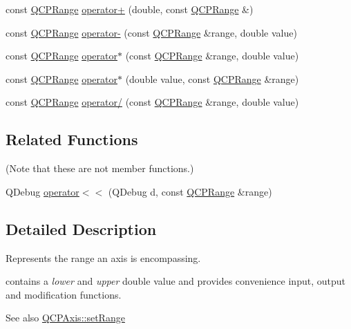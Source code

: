 \begin{DoxyCompactItemize}
\item 
const \hyperlink{class_q_c_p_range}{Q\+C\+P\+Range} \hyperlink{class_q_c_p_range_a9fb2e9941d32001482df670c0d704977}{operator+} (double, const \hyperlink{class_q_c_p_range}{Q\+C\+P\+Range} \&)
\item 
const \hyperlink{class_q_c_p_range}{Q\+C\+P\+Range} \hyperlink{class_q_c_p_range_a797f82830b516646da8873f82e39e356}{operator-\/} (const \hyperlink{class_q_c_p_range}{Q\+C\+P\+Range} \&range, double value)
\item 
const \hyperlink{class_q_c_p_range}{Q\+C\+P\+Range} \hyperlink{class_q_c_p_range_a558b1248ff6a9e41fd5b2630555a8acc}{operator$\ast$} (const \hyperlink{class_q_c_p_range}{Q\+C\+P\+Range} \&range, double value)
\item 
const \hyperlink{class_q_c_p_range}{Q\+C\+P\+Range} \hyperlink{class_q_c_p_range_a5cb2332f6957021f47cc768089f4f090}{operator$\ast$} (double value, const \hyperlink{class_q_c_p_range}{Q\+C\+P\+Range} \&range)
\item 
const \hyperlink{class_q_c_p_range}{Q\+C\+P\+Range} \hyperlink{class_q_c_p_range_a4b366a3a21974c88e09b0d39d4a24a4b}{operator/} (const \hyperlink{class_q_c_p_range}{Q\+C\+P\+Range} \&range, double value)
\end{DoxyCompactItemize}
\subsection*{Related Functions}
(Note that these are not member functions.) \begin{DoxyCompactItemize}
\item 
Q\+Debug \hyperlink{class_q_c_p_range_ab4b7d434541ec2e2e00ef3764dde90d8}{operator$<$$<$} (Q\+Debug d, const \hyperlink{class_q_c_p_range}{Q\+C\+P\+Range} \&range)
\end{DoxyCompactItemize}


\subsection{Detailed Description}
Represents the range an axis is encompassing. 

contains a {\itshape lower} and {\itshape upper} double value and provides convenience input, output and modification functions.

\begin{DoxySeeAlso}{See also}
\hyperlink{class_q_c_p_axis_aebdfea5d44c3a0ad2b4700cd4d25b641}{Q\+C\+P\+Axis\+::set\+Range} 
\end{DoxySeeAlso}


